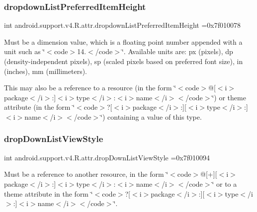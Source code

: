 \subsubsection{\texorpdfstring{dropdown\+List\+Preferred\+Item\+Height}{dropdownListPreferredItemHeight}}
{\footnotesize\ttfamily int android.\+support.\+v4.\+R.\+attr.\+dropdown\+List\+Preferred\+Item\+Height =0x7f010078\hspace{0.3cm}{\ttfamily [static]}}

Must be a dimension value, which is a floating point number appended with a unit such as \char`\"{}$<$code$>$14.\+5sp$<$/code$>$\char`\"{}. Available units are\+: px (pixels), dp (density-\/independent pixels), sp (scaled pixels based on preferred font size), in (inches), mm (millimeters). 

This may also be a reference to a resource (in the form \char`\"{}$<$code$>$@\mbox{[}$<$i$>$package$<$/i$>$\+:\mbox{]}$<$i$>$type$<$/i$>$\+:$<$i$>$name$<$/i$>$$<$/code$>$\char`\"{}) or theme attribute (in the form \char`\"{}$<$code$>$?\mbox{[}$<$i$>$package$<$/i$>$\+:\mbox{]}\mbox{[}$<$i$>$type$<$/i$>$\+:\mbox{]}$<$i$>$name$<$/i$>$$<$/code$>$\char`\"{}) containing a value of this type. \mbox{\label{classandroid_1_1support_1_1v4_1_1R_1_1attr_a2b5afda32e7bb835a1f0d4c087801418}} 
\subsubsection{\texorpdfstring{drop\+Down\+List\+View\+Style}{dropDownListViewStyle}}
{\footnotesize\ttfamily int android.\+support.\+v4.\+R.\+attr.\+drop\+Down\+List\+View\+Style =0x7f010094\hspace{0.3cm}{\ttfamily [static]}}

Must be a reference to another resource, in the form \char`\"{}$<$code$>$@\mbox{[}+\mbox{]}\mbox{[}$<$i$>$package$<$/i$>$\+:\mbox{]}$<$i$>$type$<$/i$>$\+:$<$i$>$name$<$/i$>$$<$/code$>$\char`\"{} or to a theme attribute in the form \char`\"{}$<$code$>$?\mbox{[}$<$i$>$package$<$/i$>$\+:\mbox{]}\mbox{[}$<$i$>$type$<$/i$>$\+:\mbox{]}$<$i$>$name$<$/i$>$$<$/code$>$\char`\"{}. \mbox{\label{classandroid_1_1support_1_1v4_1_1R_1_1attr_a80537fe05e995799ee013712788c6ca6}} 

